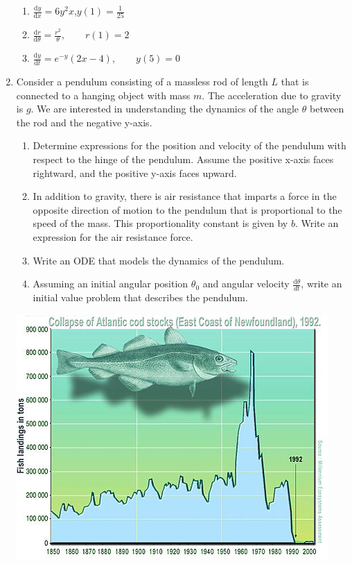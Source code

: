 \begin{enumerate}
\begin{enumerate}
    \item $\frac{\mathrm d y}{\mathrm d x} = 6y^2x$,\qquad $y(1) = \frac{1}{25}$

    \item $\frac{\mathrm d r}{\mathrm d \theta} = \frac{r^2}{\theta},\qquad r(1) = 2 $  

    \item $\frac{\mathrm d y}{\mathrm d t} = e^{-y}(2x-4),\qquad y(5)=0$ 
\end{enumerate}

\item Consider a pendulum consisting of a massless rod of length $L$ that is connected to a hanging object with mass $m$. The acceleration due to gravity is $g$. We are interested in understanding the dynamics of the angle $\theta$ between the rod and the negative y-axis.
\begin{enumerate}
    \item Determine expressions for the position and velocity of the pendulum with respect to the hinge of the pendulum. Assume the positive x-axis faces rightward, and the positive y-axis faces upward.

    \item In addition to gravity, there is air resistance that imparts a force in the opposite direction of motion to the pendulum that is proportional to the speed of the mass. This proportionality constant is given by $b$. Write an expression for the air resistance force.

    \item Write an ODE that models the dynamics of the pendulum.

    \item Assuming an initial angular position $\theta_0$ and angular velocity $\frac{\mathrm d\theta}{dt}$, write an initial value problem that describes the pendulum.
\end{enumerate}

\clearpage
\centering 
\includegraphics[scale=2]{fish.jpeg}


\end{enumerate}
